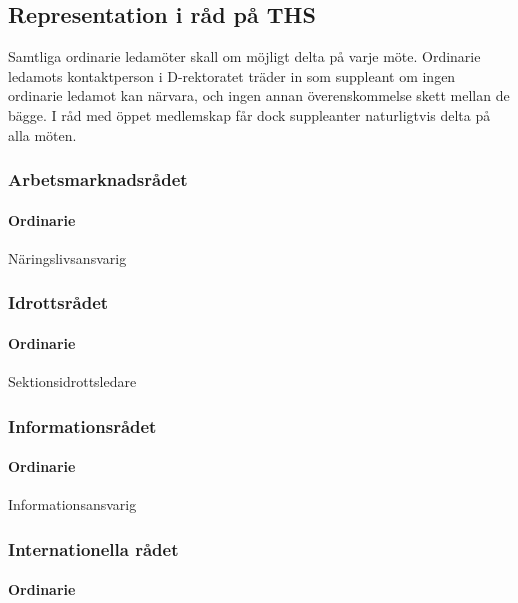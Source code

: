 \documentclass{dgovdoc}
\begin{document}
\subsection{Representation i råd på THS}

Samtliga ordinarie ledamöter skall om möjligt delta på varje möte. Ordinarie
ledamots kontaktperson i D-rektoratet träder in som suppleant om ingen
ordinarie ledamot kan närvara, och ingen annan överenskommelse skett mellan de
bägge. I råd med öppet medlemskap får dock suppleanter naturligtvis delta på
alla möten.

\subsubsection{Arbetsmarknadsrådet}

\paragraph{Ordinarie}

Näringslivsansvarig

\subsubsection{Idrottsrådet}

\paragraph{Ordinarie}

Sektionsidrottsledare

\subsubsection{Informationsrådet}

\paragraph{Ordinarie}

Informationsansvarig

\subsubsection{Internationella rådet}

\paragraph{Ordinarie}
\end{document}
